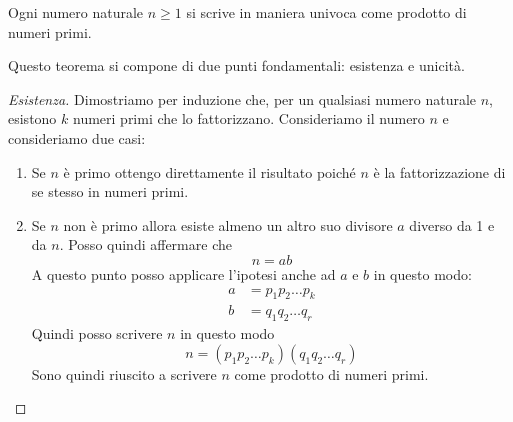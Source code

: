 \begin{theorem}
	Ogni numero naturale $n \geq 1$ si scrive in maniera univoca come prodotto di numeri primi.

	Questo teorema si compone di due punti fondamentali: esistenza e unicit\`a.
	\begin{proof}[Esistenza]
		Dimostriamo per induzione che, per un qualsiasi numero naturale $n$, esistono $k$ numeri
		primi che lo fattorizzano.
		Consideriamo il numero $n$ e consideriamo due casi:
		\begin{enumerate}
			\item Se $n$ \`e primo ottengo direttamente il risultato poich\'e $n$ \`e la
			      fattorizzazione di se stesso in numeri primi.
			\item Se $n$ non \`e primo allora esiste almeno un altro suo divisore $a$ diverso da
			      1 e da $n$. Posso quindi affermare che
			      \begin{equation*}
				      n = ab
			      \end{equation*}
			      A questo punto posso applicare l'ipotesi anche ad $a$ e $b$ in questo modo:
			      \begin{equation*}
				      \begin{array}{ll}
					      a & = p_1 p_2 \dots p_k \\
					      b & = q_1 q_2 \dots q_r
				      \end{array}
			      \end{equation*}
			      Quindi posso scrivere $n$ in questo modo
			      \begin{equation*}
				      n = (p_1 p_2 \dots p_k)(q_1 q_2 \dots q_r)
			      \end{equation*}
			      Sono quindi riuscito a scrivere $n$ come prodotto di numeri primi.
		\end{enumerate}
	\end{proof}


\end{theorem}
